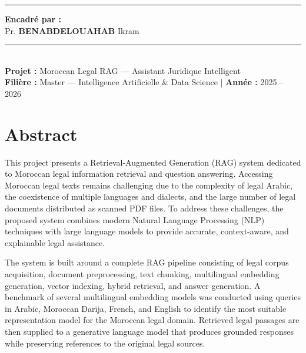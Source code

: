 \documentclass[12pt,a4paper]{report}
\begin{document}
\begin{titlepage}
\begin{center}
\begin{center}
    \vspace{0.4cm}
    \textcolor{BorderGray}{\rule{0.4\linewidth}{0.3pt}}
    \vspace{0.3cm}

    \textcolor{MidGray}{\small\bfseries\sffamily Encadré par :}\\[0.15cm]
    Pr. \textbf{\textsc{BENABDELOUAHAB}} Ikram
\end{center}
        \vfill
        \textcolor{BorderGray}{\rule{\linewidth}{0.4pt}}\\[0.4cm]
        {\normalsize\textbf{Projet :} Moroccan Legal RAG --- Assistant Juridique Intelligent
        \\
         \textbf{Filière :} Master --- Intelligence Artificielle \& Data Science
         \quad\textcolor{BorderGray}{|}\quad
         \textbf{Année :} 2025 -- 2026}
        \vspace*{0.6cm}
    \end{center}
\end{titlepage}



\chapter*{Abstract}

This project presents a Retrieval-Augmented Generation (RAG) system dedicated to Moroccan legal information retrieval and question answering. Accessing Moroccan legal texts remains challenging due to the complexity of legal Arabic, the coexistence of multiple languages and dialects, and the large number of legal documents distributed as scanned PDF files. To address these challenges, the proposed system combines modern Natural Language Processing (NLP) techniques with large language models to provide accurate, context-aware, and explainable legal assistance.

The system is built around a complete RAG pipeline consisting of legal corpus acquisition, document preprocessing, text chunking, multilingual embedding generation, vector indexing, hybrid retrieval, and answer generation. A benchmark of several multilingual embedding models was conducted using queries in Arabic, Moroccan Darija, French, and English to identify the most suitable representation model for the Moroccan legal domain. Retrieved legal passages are then supplied to a generative language model that produces grounded responses while preserving references to the original legal sources.
\end{document}
